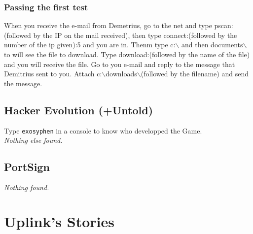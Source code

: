 \documentclass[11pt,twoside,a4paper]{book}
\begin{document}
\subsection{Passing the first test}

When you receive the e-mail from Demetrius, go to the net and type pscan:(followed by the IP on the mail received), then type connect:(followed by the number of the ip given):5 and you are in. Thenm type c:$\backslash$ and then documents$\backslash$ to will see the file to download. Type download:(followed by the name of the file) and you will receive the file. Go to you e-mail and reply to the message that Demitrius sent to you. Attach c:$\backslash$downloads$\backslash$(followed by the filename) and send the message.

\section{Hacker Evolution (+Untold)}

Type \texttt{exosyphen} in a console to know who developped the Game. ~\\

\emph{Nothing else found. }

\section{PortSign}

\emph{Nothing found. }


\chapter{Uplink's Stories}
\end{document}
